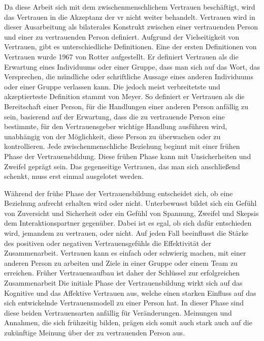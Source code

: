 \documentclass[a4paper,11pt]{article}%
\renewcommand{\\}{\vspace*{0.5\baselineskip} \newline}
\begin{document}
Da diese Arbeit sich mit dem zwischenmenschlichem Vertrauen beschäftigt, wird das Vertrauen in die Akzeptanz der \ac{vr} nicht weiter behandelt.
Vertrauen wird in dieser Ausarbeitung als bilaterales Konstrukt zwischen einer vertrauenden Person und einer zu vertrauenden Person definiert.
Aufgrund der Vielseitigkeit von Vertrauen, gibt es unterschiedliche Definitionen. \newline
Eine der ersten Definitionen von Vertrauen wurde 1967 von Rotter aufgestellt. Er definiert Vertrauen als 
\\
\dq die Erwartung eines Individuums oder einer Gruppe, dass man sich auf das Wort, das Versprechen, die mündliche oder schriftliche Aussage eines anderen Individuums oder einer Gruppe verlassen kann\dq{}. \citep[p.651]{rotter1967new}
\\
Die jedoch meist verbreitetste und akzeptierteste Definition stammt von Meyer.\citep[p.712]{mayer1995integrative} So definiert er Vertrauen als 
\\ 
\dq die Bereitschaft einer Person, für die Handlungen einer anderen Person anfällig zu sein, basierend auf der Erwartung, dass die zu vertrauende Person eine bestimmte, für den Vertrauensgeber wichtige Handlung ausführen wird, unabhängig von der Möglichkeit, diese Person zu überwachen oder zu kontrollieren.\dq{}
\\
Jede zwischenmenschliche Beziehung beginnt mit einer frühen Phase der Vertrauensbildung. Diese frühen Phase kann mit Unsicherheiten und Zweifel geprägt sein. Das gegenseitige Vertrauen, das man sich anschließend schenkt, muss erst einmal ausgelotet werden. 

Während der frühe Phase der Vertrauensbildung entscheidet sich, ob eine Beziehung aufrecht erhalten wird oder nicht. Unterbewusst bildet sich ein Gefühl von Zuversicht und Sicherheit oder ein Gefühl von Spannung, Zweifel und Skepsis dem Interaktionspartner gegenüber. 
Dabei ist es egal, ob sich dafür entschieden wird, jemandem zu vertrauen, oder nicht. Auf jeden Fall beeinflusst die Stärke des positiven oder negativen Vertrauensgefühls die Effektivität der Zusammenarbeit. Vertrauen kann es einfach oder schwierig machen, mit einer anderen Person zu arbeiten und Ziele in einer Gruppe oder einem Team zu erreichen.
Früher Vertrauensaufbau ist daher der Schlüssel zur erfolgreichen Zusammenarbeit \citep[p.405-406]{bigley1998straining}
Die initiale Phase der Vertrauensbildung wirkt sich auf das Kognitive und das Affektive Vertrauen aus, welche einen starken Einfluss auf das sich entwickelnde Vertrauensmodell zu einer Person hat. In dieser Phase sind diese beiden Vertrauensarten anfällig für Veränderungen. \citep[p.461-462]{baldwin1992relational}
Meinungen und Annahmen, die sich frühzeitig bilden, prägen sich somit auch stark auch auf die zukünftige Meinung über der zu vertrauenden Person aus.
\end{document}
